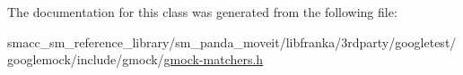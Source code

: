 The documentation for this class was generated from the following file\+:\begin{DoxyCompactItemize}
\item 
smacc\+\_\+sm\+\_\+reference\+\_\+library/sm\+\_\+panda\+\_\+moveit/libfranka/3rdparty/googletest/googlemock/include/gmock/\hyperlink{gmock-matchers_8h}{gmock-\/matchers.\+h}\end{DoxyCompactItemize}
